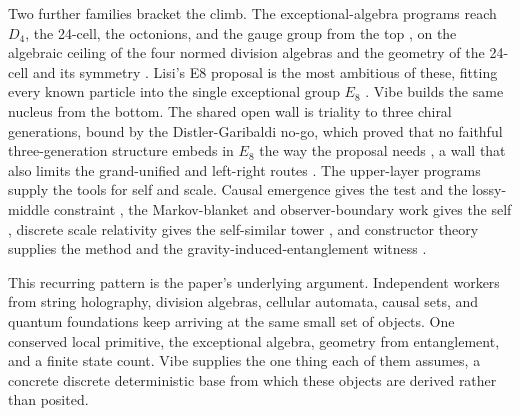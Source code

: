 Two further families bracket the climb. The exceptional-algebra programs reach $D_4$, the 24-cell, the octonions, and the gauge group from the top \cite{baez2002octonions, gunaydin1973, furey2018}, on the algebraic ceiling of the four normed division algebras \cite{hurwitz1898} and the geometry of the 24-cell and its symmetry \cite{coxeter1973, conway2003}. Lisi's E8 proposal is the most ambitious of these, fitting every known particle into the single exceptional group $E_8$ \cite{lisi2007}. Vibe builds the same nucleus from the bottom. The shared open wall is triality to three chiral generations, bound by the Distler-Garibaldi no-go, which proved that no faithful three-generation structure embeds in $E_8$ the way the proposal needs \cite{distler2010}, a wall that also limits the grand-unified and left-right routes \cite{georgi1974, boyle2020}. The upper-layer programs supply the tools for self and scale. Causal emergence gives the test and the lossy-middle constraint \cite{hoel2013}, the Markov-blanket and observer-boundary work gives the self \cite{friston2010, fields2018}, discrete scale relativity gives the self-similar tower \cite{oldershaw2007}, and constructor theory supplies the method and the gravity-induced-entanglement witness \cite{deutsch2015, marletto2017, bose2017}.

This recurring pattern is the paper's underlying argument. Independent workers from string holography, division algebras, cellular automata, causal sets, and quantum foundations keep arriving at the same small set of objects. One conserved local primitive, the exceptional algebra, geometry from entanglement, and a finite state count. Vibe supplies the one thing each of them assumes, a concrete discrete deterministic base from which these objects are derived rather than posited.
